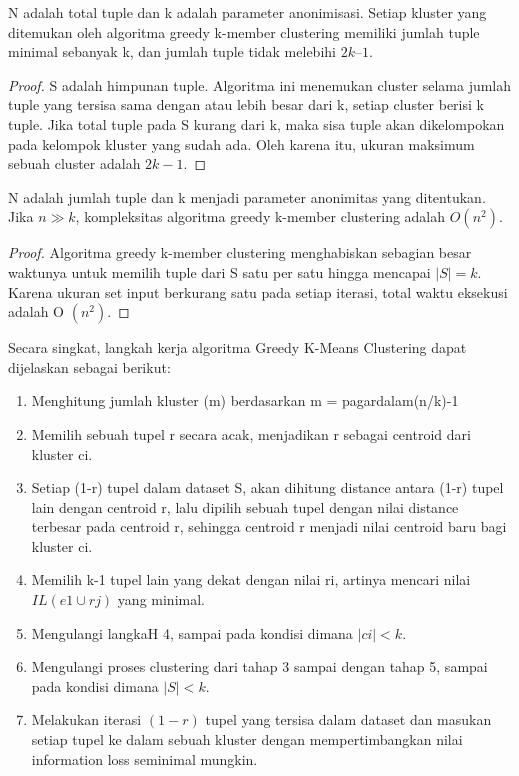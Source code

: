 \begin{theorem}
N adalah total tuple dan k adalah parameter anonimisasi. Setiap kluster yang ditemukan oleh algoritma greedy k-member clustering memiliki jumlah tuple minimal sebanyak k, dan jumlah tuple tidak melebihi $2k–1$.
\end{theorem}

\begin{proof}
S adalah himpunan tuple. Algoritma ini menemukan cluster selama jumlah tuple yang tersisa sama dengan atau lebih besar dari k, setiap cluster berisi k tuple. Jika total tuple pada S kurang dari k, maka sisa tuple akan dikelompokan pada kelompok kluster yang sudah ada. Oleh karena itu, ukuran maksimum sebuah cluster adalah $2k - 1$.
\end{proof}

\begin{theorem}
N adalah jumlah tuple dan k menjadi parameter anonimitas yang ditentukan. Jika $n \gg k$, kompleksitas algoritma greedy k-member clustering adalah $O(n^2)$.
\end{theorem}

\begin{proof}
Algoritma greedy k-member clustering menghabiskan sebagian besar waktunya untuk memilih tuple dari S satu per satu hingga mencapai $|S| = k$. Karena ukuran set input berkurang satu pada setiap iterasi, total waktu eksekusi adalah O $(n^2)$.
\end{proof}

\noindent Secara singkat, langkah kerja algoritma Greedy K-Means Clustering dapat dijelaskan sebagai berikut:

\begin{enumerate}
\item Menghitung jumlah kluster (m) berdasarkan m = pagardalam(n/k)-1
\item Memilih sebuah tupel r secara acak, menjadikan r sebagai centroid dari kluster ci. 
\item Setiap (1-r) tupel dalam dataset S, akan dihitung distance antara (1-r) tupel lain dengan centroid r, lalu dipilih sebuah tupel dengan nilai distance terbesar pada centroid r, sehingga centroid r menjadi nilai centroid baru bagi kluster ci.
\item Memilih k-1 tupel lain yang dekat dengan nilai ri, artinya mencari nilai $IL(e1 \cup {rj})$ yang minimal.
\item Mengulangi langkaH 4, sampai pada kondisi dimana $|ci| < k$.
\item Mengulangi proses clustering dari tahap 3 sampai dengan tahap 5, sampai pada kondisi dimana $|S| < k$.  
\item Melakukan iterasi $(1-r)$ tupel yang tersisa dalam dataset dan masukan setiap tupel ke dalam sebuah kluster dengan mempertimbangkan nilai information loss seminimal mungkin. 
\end{enumerate}


